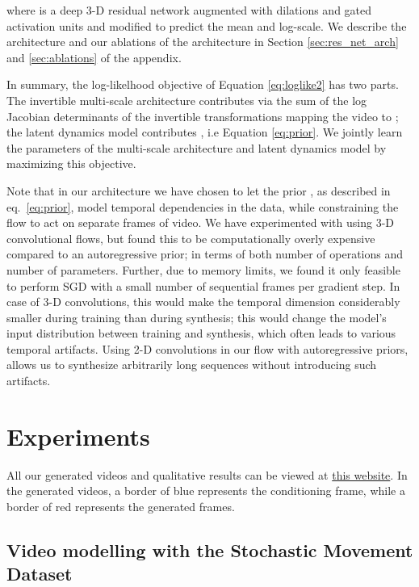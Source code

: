 \documentclass{article} \usepackage{iclr2020_conference,times}
\begin{document}
where  is a deep 3-D residual network \citep{he2015deep} augmented with dilations and gated activation units and modified to predict the mean and log-scale. We describe the architecture and our ablations of the architecture in Section \ref{sec:res_net_arch} and \ref{sec:ablations} of the appendix.

In summary, the log-likelhood objective of Equation \eqref{eq:loglike2} has two parts. The invertible multi-scale architecture contributes  via the sum of the log Jacobian determinants of the invertible transformations mapping the video  to ; the latent dynamics model contributes , i.e Equation \eqref{eq:prior}. We jointly learn the parameters of the multi-scale architecture and latent dynamics model by maximizing this objective.

Note that in our architecture we have chosen to let the prior , as described in eq.~\eqref{eq:prior}, model temporal dependencies in the data, while constraining the flow  to act on separate frames of video. We have experimented with using 3-D convolutional flows, but found this to be computationally overly expensive compared to an autoregressive prior; in terms of both number of operations and number of parameters. Further, due to memory limits, we found it only feasible to perform SGD with a small number of sequential frames per gradient step. In case of 3-D convolutions, this would make the temporal dimension considerably smaller during training than during synthesis; this would change the model's input distribution between training and synthesis, which often leads to various temporal artifacts. Using 2-D convolutions in our flow  with autoregressive priors, allows us to synthesize arbitrarily long sequences without introducing such artifacts. 


\section{Experiments}

All our generated videos and qualitative results can be viewed at \href{https://sites.google.com/corp/view/videoflow/home}{this website}. In the generated videos, a border of blue represents the conditioning frame, while a border of red represents the generated frames.


\subsection{Video modelling with the Stochastic Movement Dataset}
\end{document}
